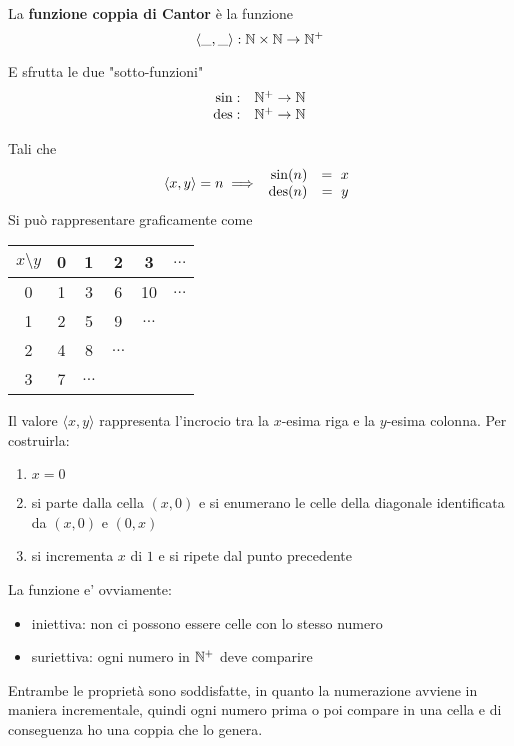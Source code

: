La \textbf{funzione coppia di Cantor} è la funzione
$$ \langle \_ , \_ \rangle: \mathbb{N} \times \mathbb{N} \rightarrow \mathbb{N}^+ $$

E sfrutta le due "sotto-funzioni" 
$$
\begin{array}{r c}
	\sin: & \mathbb{N}^+ \rightarrow \mathbb{N} \\
	\operatorname{des}: & \mathbb{N}^+ \rightarrow \mathbb{N}
\end{array}
$$

Tali che 
$$ \langle x,y \rangle = n \implies \begin{array}{r c}
	\sin (n) & = \ x \\
	\operatorname{des} (n) & = \ y
\end{array}$$
Si può rappresentare graficamente come

\begin{center}
	\begin{minipage}[h]{0.45\textwidth}
		{\renewcommand{\arraystretch}{1.3}
			\begin{tabular}{c | c c c c c}
				$x\setminus y$ & 0 & 1 & 2 & 3 & $\dots$ \\ 
				\hline
				0 & 1 & 3 & 6 & 10 & $\dots$ \\
				1 & 2 & 5 & 9 & $\dots$ & \\
				2 & 4 & 8 & $\dots$ && \\
				3 & 7 & $\dots$ &&& \\
		\end{tabular}}
	\end{minipage}
	\hfill 
	\begin{minipage}[h]{0.45\textwidth}
		
	\end{minipage}
\end{center}

Il valore $\langle x,y \rangle$ rappresenta l'incrocio tra la $x$-esima riga e la $y$-esima colonna. Per costruirla:
\begin{enumerate}
	\item $x = 0$
    
	\item si parte dalla cella $(x,0)$ e si enumerano le celle della diagonale identificata da $(x,0)$ e $(0,x)$
	
    \item si incrementa $x$ di $1$ e si ripete dal punto precedente
\end{enumerate}

La funzione e' ovviamente:
\begin{itemize}
	\item iniettiva: non ci possono essere celle con lo stesso numero
	\item suriettiva: ogni numero in $\mathbb{N}^+$ deve comparire
\end{itemize}
Entrambe le proprietà sono soddisfatte, in quanto la numerazione avviene in maniera incrementale, quindi ogni numero prima o poi compare in una cella e di conseguenza ho una coppia che lo genera.

